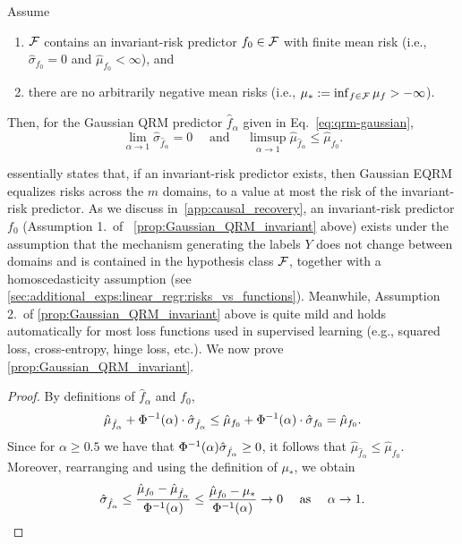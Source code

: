 \documentclass{article}
\begin{document}
%
%
%
\begin{proposition}
    \label{prop:Gaussian_QRM_invariant}
    Assume
    \begin{enumerate}
        \item $\mathcal{F}$ contains an invariant-risk predictor $f_0 \in \mathcal{F}$ with finite mean risk (i.e., $\hat\sigma_{f_0} = 0$ and $\hat\mu_{f_0} < \infty$), and
        \item there are no arbitrarily negative mean risks (i.e., $\mu_* := \inf_{f \in \mathcal{F}} \mu_f > -\infty$).
    \end{enumerate}
    Then, for the Gaussian QRM predictor $\hat f_\alpha$ given in Eq.~\eqref{eq:qrm-gaussian},
    \[\lim_{\alpha \to 1} \hat\sigma_{\hat f_\alpha} = 0 \quad \text{ and } \quad \limsup_{\alpha \to 1} \hat\mu_{\hat f_\alpha} \leq \hat\mu_{f_0}.\]
\end{proposition}
 essentially states that, if an invariant-risk predictor exists, then Gaussian EQRM equalizes risks across the $m$ domains, to a value at most the risk of the invariant-risk predictor.
As we discuss in~\cref{app:causal_recovery},
%
an invariant-risk predictor $f_0$ (Assumption 1.~of ~\cref{prop:Gaussian_QRM_invariant} above) exists under the assumption that the mechanism generating the labels $Y$ does not change between domains and is contained in the hypothesis class $\mathcal{F}$, together with a homoscedasticity assumption (see \cref{sec:additional_exps:linear_regr:risks_vs_functions}).
Meanwhile, Assumption 2.~of \cref{prop:Gaussian_QRM_invariant} above is quite mild and holds automatically for most loss functions used in supervised learning (e.g., squared loss, cross-entropy, hinge loss, etc.). We now prove \cref{prop:Gaussian_QRM_invariant}.
\begin{proof}
    By definitions of $\hat f_\alpha$ and $f_0$,
    \begin{equation}
        \hat{\mu}_{\hat f_\alpha} + \Phi^{-1}(\alpha) \cdot \hat{\sigma}_{\hat f_\alpha}
        \leq \hat{\mu}_{f_0} + \Phi^{-1}(\alpha) \cdot \hat{\sigma}_{f_0}
        = \hat{\mu}_{f_0}.
        \label{ineq:gaussian_basic_ineq}
    \end{equation}
    Since for $\alpha \geq 0.5$ we have that $\Phi^{-1}(\alpha) \hat{\sigma}_{\hat f_\alpha} \geq 0$, it follows that $\hat{\mu}_{\hat f_\alpha} \leq \hat{\mu}_{f_0}$. Moreover, rearranging and using the definition of $\mu_*$, we obtain
    \[\hat{\sigma}_{\hat f_\alpha}
      \leq \frac{\hat{\mu}_{f_0} - \hat{\mu}_{\hat f_\alpha}}{\Phi^{-1}(\alpha)}
      \leq \frac{\hat{\mu}_{f_0} - \mu_*}{\Phi^{-1}(\alpha)}
      \to 0
      \quad \text{ as } \quad \alpha \to 1.\]
\end{proof}
%
\end{document}
